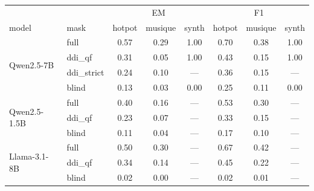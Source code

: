 \begin{tabular}{llccc ccc}
\toprule
 & & \multicolumn{3}{c}{EM} & \multicolumn{3}{c}{F1} \\
model & mask & hotpot & musique & synth & hotpot & musique & synth \\
\midrule
\multirow{4}{*}{Qwen2.5-7B} & full & 0.57 & 0.29 & 1.00 & 0.70 & 0.38 & 1.00 \\
 & ddi\_qf & 0.31 & 0.05 & 1.00 & 0.43 & 0.15 & 1.00 \\
 & ddi\_strict & 0.24 & 0.10 & --- & 0.36 & 0.15 & --- \\
 & blind & 0.13 & 0.03 & 0.00 & 0.25 & 0.11 & 0.00 \\
\midrule
\multirow{3}{*}{Qwen2.5-1.5B} & full & 0.40 & 0.16 & --- & 0.53 & 0.30 & --- \\
 & ddi\_qf & 0.23 & 0.07 & --- & 0.33 & 0.15 & --- \\
 & blind & 0.11 & 0.04 & --- & 0.17 & 0.10 & --- \\
\midrule
\multirow{3}{*}{Llama-3.1-8B} & full & 0.50 & 0.30 & --- & 0.67 & 0.42 & --- \\
 & ddi\_qf & 0.34 & 0.14 & --- & 0.45 & 0.22 & --- \\
 & blind & 0.02 & 0.00 & --- & 0.02 & 0.01 & --- \\
\bottomrule
\end{tabular}
